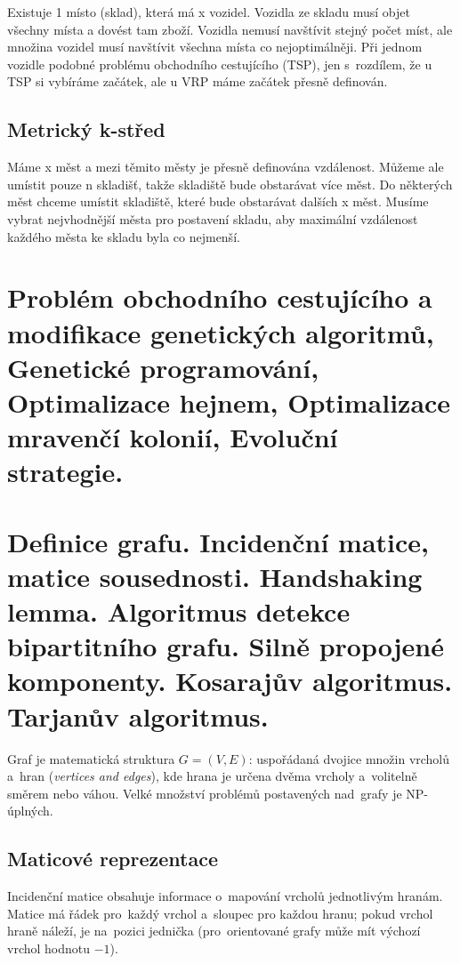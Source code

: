 Existuje 1 místo (sklad), která má x vozidel.
Vozidla ze skladu musí objet všechny místa a dovést tam zboží. 
Vozidla nemusí navštívit stejný počet míst, ale množina vozidel musí navštívit všechna místa co nejoptimálněji. 
Při jednom vozidle podobné problému obchodního cestujícího (TSP), jen s~rozdílem, že u TSP si vybíráme začátek, ale u VRP máme začátek přesně definován.

\subsection{Metrický k-střed}

Máme x měst a mezi těmito městy je přesně definována vzdálenost.
Můžeme ale umístit pouze n skladišť, takže skladiště bude obstarávat více měst. 
Do některých měst chceme umístit skladiště, které bude obstarávat dalších x měst.
Musíme vybrat nejvhodnější města pro postavení skladu, aby maximální vzdálenost každého města ke skladu byla co nejmenší.


\clearpage
\section{Problém obchodního cestujícího a modifikace genetických algoritmů, Genetické programování, Optimalizace hejnem, Optimalizace mravenčí kolonií, Evoluční strategie.}


\clearpage
\section{Definice grafu. Incidenční matice, matice sousednosti. Handshaking lemma. Algoritmus detekce bipartitního grafu. Silně propojené komponenty. Kosarajův algoritmus. Tarjanův algoritmus.}

Graf je matematická struktura $G = (V, E)$: uspořádaná dvojice množin vrcholů a~hran (\emph{vertices and edges}), kde hrana je určena dvěma vrcholy a~volitelně směrem nebo váhou.
Velké množství problémů postavených nad~grafy je NP-úplných.

\subsection{Maticové reprezentace}

Incidenční matice obsahuje informace o~mapování vrcholů jednotlivým hranám.
Matice má řádek pro~každý vrchol a~sloupec pro každou hranu; pokud vrchol hraně náleží, je na~pozici jednička (pro~orientované grafy může mít výchozí vrchol hodnotu $-1$).

